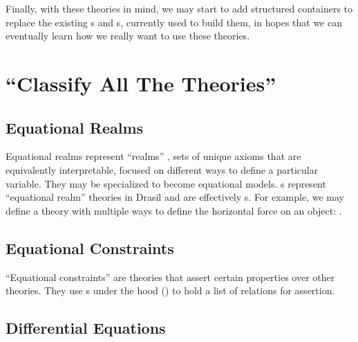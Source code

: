 \exampleEquationalRealmImg{}

\exampleEquationalConstraintsImg{}

Finally, with these theories in mind, we may start to add structured containers
to replace the existing \RelationConcept{}s and \Relation{}s, currently used to
build them, in hopes that we can eventually learn how we really want to use
these theories.

\section{\textquotedblleft{}Classify All The Theories\textquotedblright{}}
\label{chap:more-theory-kinds:sec:classify-all-the-theories}

\subsection{Equational Realms}
\label{chap:more-theory-kinds:sec:classify-all-the-theories:subsec:equational-realms}

Equational realms represent ``realms'' \cite{Carette2014realms}, sets of unique
axioms that are equivalently interpretable, focused on different ways to define
a particular variable. They may be specialized to become equational models.
\EquationalRealm{}s represent ``equational realm'' theories in Drasil and are
effectively \MultiDefn{}s. For example, we may define a theory with multiple
ways to define the horizontal force on an object:
.

\currentExampleEquationalRealmHaskell{}

\currentMultiDefnHaskell{}

\currentDefiningExprHaskell{}

\subsection{Equational Constraints}
\label{chap:more-theory-kinds:sec:classify-all-the-theories:subsec:equational-constraints}

``Equational constraints'' are theories that assert certain properties over
other theories. They use \ConstraintSet{}s under the hood
() to hold a list of relations for assertion.

\currentExampleEquationalConstraintsHaskell{}

\currentConstraintSetHaskell{}

\subsection{Differential Equations}
\label{chap:more-theory-kinds:sec:classify-all-the-theories:subsec:differential-equations}

